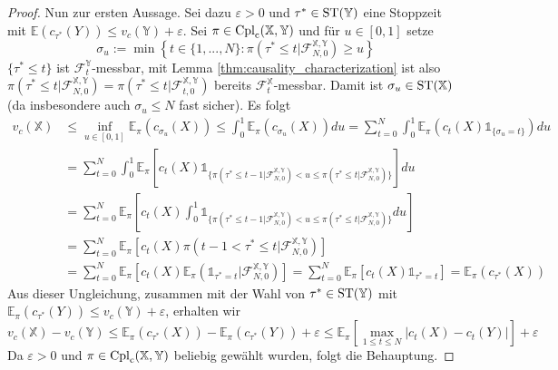 \begin{proof}
Nun zur ersten Aussage. Sei dazu $\varepsilon > 0$ und $\tau^*\in \operatorname{ST}(\mathbb{Y})$ eine Stoppzeit mit $\mathbb{E}(c_{\tau^*}(Y)) \leq v_c(\mathbb{Y}) + \varepsilon$. Sei $\pi \in \operatorname{Cpl}_{\operatorname{c}}(\mathbb{X,Y})$ und für $u \in [0,1]$ setze 
$$\sigma_u := \min \left\{ t \in \{1,...,N\}: \pi\left(\tau^*\leq t \vert \mathcal{F}_{N,0}^\mathbb{X,Y}\right) \geq u\right\} $$
$\{\tau^* \leq t\}$ ist $\mathcal{F}_t^\mathbb{Y}$-messbar, mit Lemma \ref{thm:causality_characterization} ist also $\pi\left( \tau^* \leq t \vert \mathcal{F}_{N,0}^\mathbb{X,Y}\right) = \pi\left( \tau^* \leq t \vert \mathcal{F}_{t,0}^\mathbb{X,Y} \right)$ bereits $\mathcal{F}_t^\mathbb{X}$-messbar. Damit ist $\sigma_u \in \operatorname{ST}(\mathbb{X})$ (da insbesondere auch $\sigma_u \leq N$ fast sicher). Es folgt 
\begin{align*}
    v_c(\mathbb{X}) &\leq \inf_{u \in [0,1]} \mathbb{E}_\pi(c_{\sigma_u}(X)) 
    \leq \int_0^1 \mathbb{E}_\pi(c_{\sigma_u}(X)) du 
    = \sum_{t=0}^N \int_0^1 \mathbb{E}_\pi(c_t(X) \mathds{1}_{\{\sigma_u = t\}}) du\\ 
    &= \sum_{t=0}^N \int_0^1 \mathbb{E}_\pi\left[c_t(X) \mathds{1}_{\{\pi(\tau^*\leq t-1 \vert \mathcal{F}_{N,0}^\mathbb{X,Y}) < u \leq \pi(\tau^*\leq t \vert \mathcal{F}_{N,0}^\mathbb{X,Y})\}}\right] du \\
    &= \sum_{t=0}^N \mathbb{E}_\pi\left[c_t(X) \int_0^1 \mathds{1}_{\{\pi(\tau^*\leq t-1 \vert \mathcal{F}_{N,0}^\mathbb{X,Y}) < u \leq \pi(\tau^*\leq t \vert \mathcal{F}_{N,0}^\mathbb{X,Y})\}} du  \right] \\ 
    &= \sum_{t=0}^N \mathbb{E}_\pi\left[c_t(X) \pi\left(t-1 < \tau^* \leq t \vert \mathcal{F}_{N,0}^\mathbb{X,Y}\right) \right]  \\
    &= \sum_{t=0}^N \mathbb{E}_\pi\left[ c_{t}(X) \mathbb{E}_\pi(\mathds{1}_{\tau^*=t} \vert \mathcal{F}_{N,0}^\mathbb{X,Y})\right] 
    = \sum_{t=0}^N \mathbb{E}_\pi\left[ c_t(X) \mathds{1}_{\tau^*=t}\right] 
    = \mathbb{E}_\pi(c_{\tau^*}(X))
\end{align*}
Aus dieser Ungleichung, zusammen mit der Wahl von $\tau^* \in \operatorname{ST}(\mathbb{Y})$ mit $\mathbb{E}_\pi(c_{\tau^*}(Y)) \leq v_c(\mathbb{Y}) + \varepsilon$, erhalten wir
$$v_c(\mathbb{X}) - v_c(\mathbb{Y}) \leq \mathbb{E}_\pi(c_{\tau^*}(X)) - \mathbb{E}_\pi(c_{\tau^*}(Y)) + \varepsilon \leq \mathbb{E}_\pi\left[ \max_{1\leq t\leq N} |c_t(X) - c_t(Y)| \right] + \varepsilon$$
Da $\varepsilon>0$ und $\pi \in \operatorname{Cpl}_{\operatorname{c}}(\mathbb{X,Y})$ beliebig gewählt wurden, folgt die Behauptung.
\end{proof}

